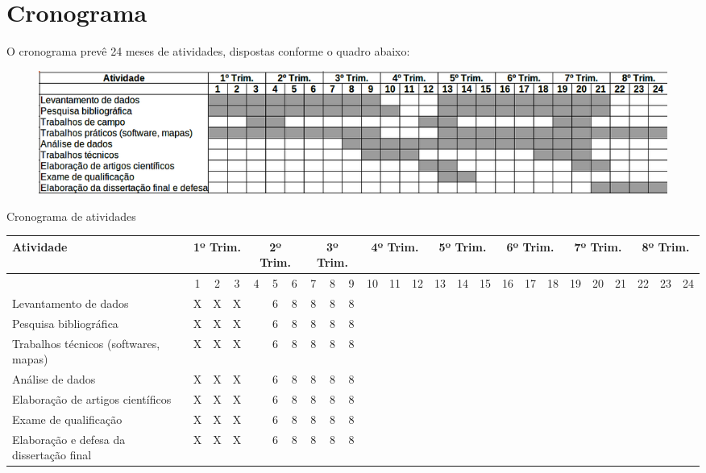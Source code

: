 \section{Cronograma}

O cronograma prevê 24 meses de atividades, dispostas conforme o quadro abaixo:

\begin{figure}[htb]
\begin{center}
    \includegraphics[scale=0.4]{crono.png}
\end{center}
\end{figure}

\begin{quadro}[!htbp]
\ABNTEXfontereduzida
\caption[Cronograma]{Cronograma de atividades}

\begin{tabular}{|l |c|c|c |c|c|c |c|c|c |c|c|c |c|c|c |c|c|c |c|c|c |c|c|c|}

\hline
\textbf{Atividade} &  \multicolumn{3}{|c|}{\textbf{1º Trim.}} & \multicolumn{3}{|c|}{\textbf{2º Trim.}} & \multicolumn{3}{|c|}{\textbf{3º Trim.}} & \multicolumn{3}{|c|}{\textbf{4º Trim.}} & \multicolumn{3}{|c|}{\textbf{5º Trim.}} & \multicolumn{3}{|c|}{\textbf{6º Trim.}} & \multicolumn{3}{|c|}{\textbf{7º Trim.}} & \multicolumn{3}{|c|}{\textbf{8º Trim.}}\\

\hline
{}  &  1 & 2  & 3  & 4  & 5  & 6  & 7  & 8  & 9  & 10  & 11  & 12  & 13  & 14  & 15  & 16  & 17  & 18  & 19  & 20  & 21 & 22 & 23 & 24 \\

\hline
Levantamento de dados  &  X & X & X & {}  & 6 & 8 & 8 & 8 & 8\\

\hline
Pesquisa bibliográfica  &  X & X & X & {}  & 6 & 8 & 8 & 8 & 8\\

\hline
Trabalhos técnicos (softwares, mapas)  &  X & X & X & {}  & 6 & 8 & 8 & 8 & 8\\

\hline
Análise de dados  &  X & X & X & {}  & 6 & 8 & 8 & 8 & 8\\

\hline
Elaboração de artigos científicos  &  X & X & X & {}  & 6 & 8 & 8 & 8 & 8\\

\hline
Exame de qualificação  &  X & X & X & {}  & 6 & 8 & 8 & 8 & 8\\

\hline
Elaboração e defesa da dissertação final  &  X & X & X & {}  & 6 & 8 & 8 & 8 & 8\\

\hline
\end{tabular}
\end{quadro}
